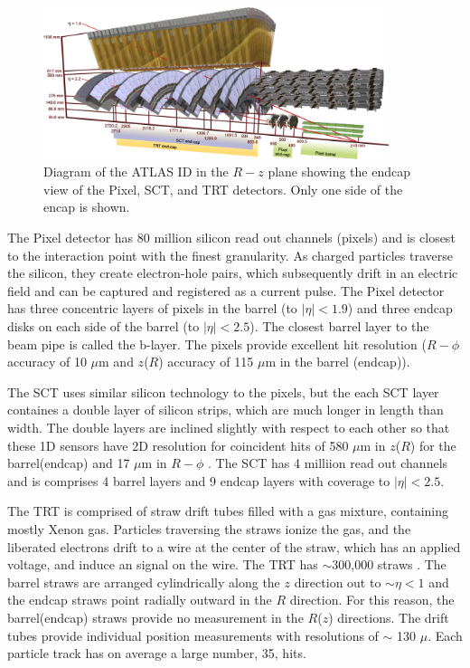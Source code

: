 \begin{figure}[!t]
\centering 
\includegraphics[width=0.9\textwidth]{figs/lhc/IDEndcap-eps-converted-to}
\caption{ Diagram of the ATLAS ID in the $R-z$ plane showing the endcap view of the Pixel, SCT, and TRT detectors. Only one side of the encap is shown. 
}
\label{figure:lhc_id_endcap}
\end{figure}

The Pixel detector has 80 million silicon read out channels (pixels) and is closest to the interaction point with the finest granularity. As charged particles traverse the silicon, they create electron-hole pairs, which subsequently drift in an electric field and can be captured and registered as a current pulse. The Pixel detector has three concentric layers of pixels in the barrel (to $|\eta| < 1.9$) and three endcap disks on each side of the barrel (to $|\eta| < 2.5$). The closest barrel layer to the beam pipe is called the b-layer. The pixels provide excellent hit resolution ($R-\phi$ accuracy of 10 $\mu$m and $z$($R$) accuracy of 115 $\mu$m in the barrel (endcap)).

The SCT uses similar silicon technology to the pixels, but the each SCT layer containes a double layer of silicon strips, which are much longer in length than width. The double layers are inclined slightly with respect to each other so that these 1D sensors have 2D resolution for coincident hits of 580 $\mu$m in $z$($R$) for the barrel(endcap) and 17 $\mu$m in $R-\phi$ . The SCT has 4 milliion read out channels and is comprises 4 barrel layers and 9 endcap layers with coverage to $|\eta| < 2.5$.


The TRT is comprised of straw drift tubes filled with a gas mixture, containing mostly Xenon gas. Particles traversing the straws ionize the gas, and the liberated electrons drift to a wire at the center of the straw, which has an applied voltage, and induce an signal on the wire. The TRT has $\sim$300,000 straws . The barrel straws are arranged cylindrically along the $z$ direction out to $\sim \eta < 1$ and the endcap straws point radially outward in the $R$ direction. For this reason, the barrel(endcap) straws provide no measurement in the $R$($z$) directions. The drift tubes provide individual position measurements with resolutions of $\sim$ 130 $\mu$. Each particle track has on average a large number, 35, hits. 

